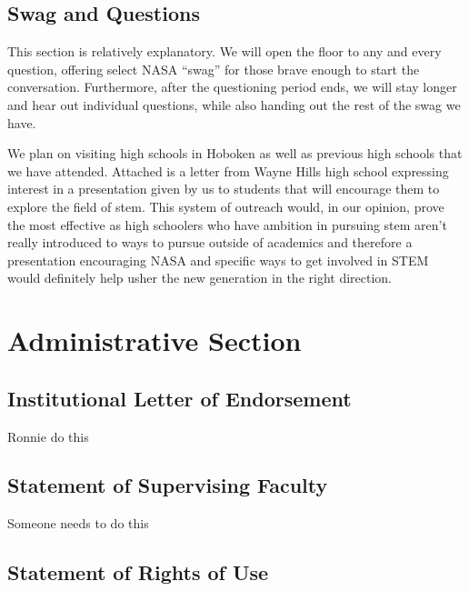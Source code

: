 \documentclass{article}
\let\Oldsection\section
\renewcommand{\section}{\FloatBarrier\Oldsection}
\let\Oldsubsection\subsection
\renewcommand{\subsection}{\FloatBarrier\Oldsubsection}
\begin{document}
\subsection{Swag and Questions}

This section is relatively explanatory. We will open the floor to any 
and every question, offering select NASA “swag” for those brave enough 
to start the conversation. Furthermore, after the questioning period 
ends, we will stay longer and hear out individual questions, while also 
handing out the rest of the swag we have. 

We plan on visiting high schools in Hoboken as well as previous high 
schools that we have attended. Attached is a letter from Wayne Hills 
high school expressing interest in a presentation given by us to 
students that will encourage them to explore the field of stem. This 
system of outreach would, in our opinion, prove the most effective as 
high schoolers who have ambition in pursuing stem aren’t really 
introduced to ways to pursue outside of academics and therefore a 
presentation encouraging NASA and specific ways to get involved in STEM 
would definitely help usher the new generation in the right direction.

\section{Administrative Section}

\subsection{Institutional Letter of Endorsement}

Ronnie do this

\subsection{Statement of Supervising Faculty}

Someone needs to do this

\subsection{Statement of Rights of Use}
\end{document}
